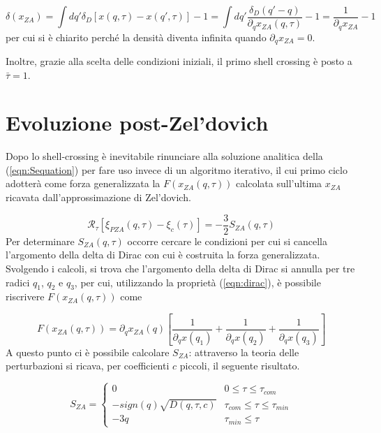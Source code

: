 \begin{equation}
    \label{eqn:density_ZA}
    \delta(x_{ZA})= \int dq' \delta_D[x(q, \tau) - x(q', \tau)] - 1 = \int dq' \frac{\delta_D(q' - q)}{\partial_q x_{ZA}(q, \tau)} - 1 = \frac{1}{\partial_q x_{ZA}}-1
\end{equation}
per cui si è chiarito perché la densità diventa infinita quando $\partial_q x_{ZA} = 0$.

Inoltre, grazie alla scelta delle condizioni iniziali, il primo shell crossing è posto a $\bar{\tau}=1$.


\section{Evoluzione post-Zel'dovich}

Dopo lo shell-crossing è inevitabile rinunciare alla soluzione analitica della (\ref{eqn:Sequation}) per 
fare uso invece di un algoritmo iterativo, il cui primo ciclo adotterà come forza generalizzata la
$F(x_{ZA}(q, \tau))$ calcolata sull'ultima $x_{ZA}$ ricavata dall'approssimazione di Zel'dovich.

\begin{equation}
    \mathcal{R}_{\tau}[\xi_{PZA}(q, \tau)-\xi_c(\tau)] = -\frac{3}{2}S_{ZA}(q, \tau)
\end{equation}
Per determinare $S_{ZA}(q, \tau)$ occorre cercare le condizioni per cui si cancella l'argomento 
della delta di Dirac con cui è costruita la forza generalizzata. Svolgendo i calcoli, si trova
che l'argomento della delta di Dirac si annulla per tre radici $q_1$, $q_2$ e $q_3$, per cui, 
utilizzando la proprietà (\ref{eqn:dirac}), è possibile riscrivere $F(x_{ZA}(q, \tau))$ come

\begin{equation}
    F(x_{ZA}(q, \tau)) = \partial_q x_{ZA}(q)\left[\frac{1}{\partial_q x(q_1)} + \frac{1}{\partial_q x(q_2)} + \frac{1}{\partial_q x(q_3)}\right]
\end{equation}
A questo punto ci è possibile calcolare $S_{ZA}$: attraverso la teoria delle perturbazioni si ricava,
per coefficienti $c$ piccoli, il seguente risultato.

\begin{equation}
    \label{eqn:SZA}
    S_{ZA} = 
    \begin{cases}
        0 & 0 \leq \tau \leq \tau_{com} \\
        -sign(q)\sqrt{D(q, \tau, c)} & \tau_{com} \leq \tau \leq \tau_{min} \\
        -3q & \tau_{min} \leq \tau
    \end{cases}
\end{equation}

